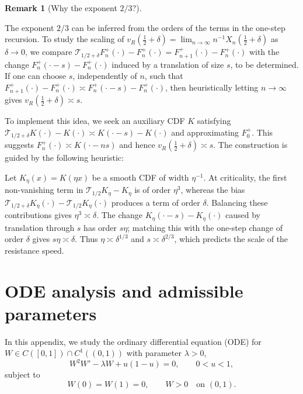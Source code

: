\documentclass[12pt,preprint]{amsart}
\numberwithin{equation}{section}
\theoremstyle{plain}
\theoremstyle{definition}
\newtheorem{remark}[theorem]{Remark}
\begin{document}
\begin{remark}[Why the exponent $2/3$?]
\label{rem:two-thirds-heuristic}

The exponent \(2/3\) can be inferred from the orders of the terms in the one-step recursion. To study the scaling of $v_R(\frac12+\delta)=\lim_{n\to\infty}n^{-1}X_n(\frac12+\delta)$ as $\delta\to0$, we compare
$\mathcal T_{1/2+\delta}F_n^+(\cdot)-F_n^+(\cdot)=F_{n+1}^+(\cdot)-F_n^+(\cdot)$ with the change
$F_n^+(\cdot-s)-F_n^+(\cdot)$ induced by a translation of size $s$, to be determined. If one can choose $s$, independently of $n$, such that
$F_{n+1}^+(\cdot)-F_n^+(\cdot)\asymp F_n^+(\cdot-s)-F_n^+(\cdot)$, then heuristically letting $n\to\infty$ gives $v_R(\frac12+\delta)\asymp s$.

To implement this idea, we seek an auxiliary CDF $K$ satisfying
$\mathcal T_{1/2+\delta}K(\cdot)-K(\cdot)\asymp K(\cdot-s)-K(\cdot)$ and approximating $F_0^+$. This suggests $F_n^+(\cdot)\asymp K(\cdot-ns)$ and hence $v_R(\frac12+\delta)\asymp s$. The construction is guided by the following heuristic:

Let \(K_\eta(x)=K(\eta x)\) be a smooth CDF of width
\(\eta^{-1}\).  At criticality, the first non-vanishing term in
\(\mathcal T_{1/2}K_\eta-K_\eta\) is of order \(\eta^3\), whereas the  bias
$\mathcal T_{1/2+\delta}K_{\eta}(\cdot)-\mathcal T_{1/2}K_{\eta}(\cdot)$  produces a term of order \(\delta\).
Balancing these contributions gives \(\eta^3\asymp\delta\).  The change \(K_{\eta}(\cdot-s)-K_{\eta}(\cdot)\) caused by translation
through $s$ has order $s\eta$; matching this with the
one-step change of order \(\delta\) gives
\(s\eta\asymp\delta\).  Thus
\(\eta\asymp\delta^{1/3}\) and
\(s\asymp\delta^{2/3}\), which predicts the scale of the resistance speed.


\end{remark}


\appendix
\section{ODE analysis and admissible parameters}
\label{app:ode}
In this appendix, we study the ordinary differential equation (ODE) for \(W\in C([0,1])\cap C^1((0,1))\) with parameter \(\lambda > 0\),
\begin{equation}
 W^2W'-\lambda W+u(1-u)=0,
 \qquad 0<u<1,
 \label{eq:W-ode}
\end{equation}
subject to
\begin{equation}
 W(0)=W(1)=0,
 \qquad W>0\quad\text{on }(0,1).
 \label{eq:W-boundary}
\end{equation}
\end{document}
